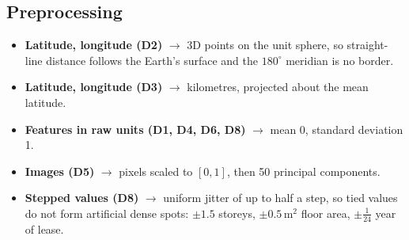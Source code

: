 \subsection{Preprocessing}\label{sec:prep}
\begin{itemize}\setlength{\itemsep}{0pt}
\item \textbf{Latitude, longitude (D2)} $\to$ 3D points on the unit sphere, so straight-line distance
follows the Earth's surface and the $180^\circ$ meridian is no border.
\item \textbf{Latitude, longitude (D3)} $\to$ kilometres, projected about the mean latitude.
\item \textbf{Features in raw units (D1, D4, D6, D8)} $\to$ mean 0, standard deviation 1.
\item \textbf{Images (D5)} $\to$ pixels scaled to $[0,1]$, then 50 principal components.
\item \textbf{Stepped values (D8)} $\to$ uniform jitter of up to half a step, so tied values do not form
artificial dense spots: $\pm1.5$ storeys, $\pm0.5$\,m$^2$ floor area, $\pm\frac{1}{24}$ year of lease.
\end{itemize}
